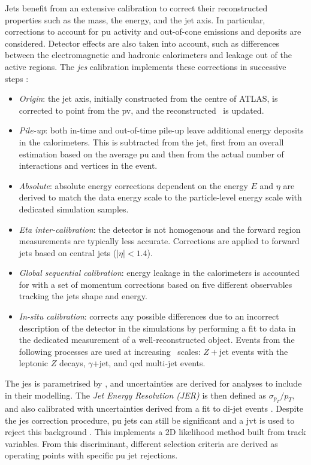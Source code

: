 Jets benefit from an extensive calibration to correct their reconstructed properties such as the mass, the energy, and the jet axis. In particular, corrections to account for \gls{pu} activity and out-of-cone emissions and deposits are considered. Detector effects are also taken into account, such as differences between the electromagnetic and hadronic calorimeters and leakage out of the active regions. The \textit{\gls{jes}} calibration implements these corrections in successive steps \cite{ATLASjesjerMeas}: 
\begin{itemize}[leftmargin=*]
\item \textit{Origin}: the jet axis, initially constructed from the centre of ATLAS, is corrected to point from the \gls{pv}, and the reconstructed \pt\ is updated.
\item \textit{Pile-up}: both in-time and out-of-time pile-up leave additional energy deposits in the calorimeters. This is subtracted from the jet, first from an overall estimation based on the average \gls{pu} and then from the actual number of interactions and vertices in the event. 
\item \textit{Absolute}: absolute energy corrections dependent on the energy $E$ and $\eta$ are derived to match the data energy scale to the particle-level energy scale with dedicated simulation samples.
\item \textit{Eta inter-calibration}: the detector is not homogenous and the forward region measurements are typically less accurate. Corrections are applied to forward jets based on central jets ($|\eta|<1.4$).
\item \textit{Global sequential calibration}: energy leakage in the calorimeters is accounted for with a set of momentum corrections based on five different observables tracking the jets shape and energy.  
\item \textit{In-situ calibration}: corrects any possible differences due to an incorrect description of the detector in the simulations by performing a fit to data in the dedicated measurement of a well-reconstructed object. Events from the following processes are used at increasing \pt\ scales: $Z+$jet events with the leptonic $Z$ decays, $\gamma$+jet, and \gls{qcd} multi-jet events.
\end{itemize}
The \gls{jes} is parametrised by \pt, and uncertainties are derived for analyses to include in their modelling. The \textit{Jet Energy Resolution (JER)} is then defined as $\sigma_{p_T}/p_T$, and also calibrated with uncertainties derived from a fit to di-jet events \cite{ATLASjesjerMeas}. Despite the \gls{jes} correction procedure, \gls{pu} jets can still be significant and a \gls{jvt} is used to reject this background \cite{ATLAS-CONF-2014-018}. This implements a 2D likelihood method built from track variables. From this discriminant, different selection criteria are derived as operating points with specific \gls{pu} jet rejections. 

